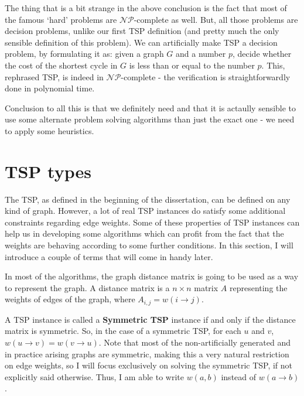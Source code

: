 \documentclass[12pt,twoside,notitlepage]{report}
\begin{document}
\smallskip 

The thing that is a bit strange in the above conclusion is the fact that most of the famous `hard' problems are $\mathcal{NP}$-complete as well. But, all those problems are decision problems, unlike our first TSP definition (and pretty much the only sensible definition of this problem). We can artificially make TSP a decision problem, by formulating it as: given a graph $G$ and a number $p$, decide whether the cost of the shortest cycle in $G$ is less than or equal to the number $p$. This, rephrased TSP, is indeed in $\mathcal{NP}$-complete - the verification is straightforwardly done in polynomial time.

\medskip

Conclusion to all this is that we definitely need and that it is actaully sensible to use some alternate problem solving algorithms than just the exact one - we need to apply some heuristics. 

\section{TSP types}

The TSP, as defined in the beginning of the dissertation, can be defined on any kind of graph. However, a lot of real TSP instances do satisfy some additional constraints regarding edge weights. Some of these properties of TSP instances can help us in developing some algorithms which can profit from the fact that the weights are behaving according to some further conditions. In this section, I will introduce a couple of terms that will come in handy later.

In most of the algorithms, the graph distance matrix is going to be used as a way to represent the graph. A distance matrix is a $n \times n$ matrix $A$ representing the weights of edges of the graph, where $A_{i, j} = w(i \rightarrow j)$.

\smallskip

A TSP instance is called a {\bf Symmetric TSP} instance if and only if the distance matrix is symmetric. So, in the case of a symmetric TSP, for each $u$ and $v$, $w(u \rightarrow v) = w(v \rightarrow u)$. Note that most of the non-artificially generated and in practice arising graphs are symmetric, making this a very natural restriction on edge weights, so I will focus exclusively on solving the symmetric TSP, if not explicitly said otherwise. Thus, I am able to write $w(a, b)$ instead of $w(a \rightarrow b)$.
\end{document}
